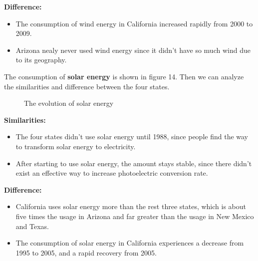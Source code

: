 \documentclass{mcmthesis}
\begin{document}
{\bf{Difference:}}

\begin{itemize}
\item The consumption of wind energy in California increased rapidly from 2000 to 2009.
\item Arizona nealy never used wind energy since it didn't have so much wind due to its geography.
\end{itemize}

The consumption of {\bf{solar energy}} is shown in figure 14. Then we can analyze the similarities and difference between the four states.

\begin{figure}[H]
  \caption{The evolution of solar energy}\label{figure14}
\end{figure}

{\bf{Similarities:}}

\begin{itemize}
\item The four states didn't use solar energy until 1988, since people find the way to transform solar energy to electricity.
\item After starting to use solar energy, the amount stays stable, since there didn't exist an effective way to increase photoelectric conversion rate.
\end{itemize}

{\bf{Difference:}}

\begin{itemize}
\item California uses solar energy more than the rest three states, which is about five times  the usage in Arizona and far greater than the usage in New Mexico and Texas.
\item The consumption of solar energy in California experiences a decrease from 1995 to 2005, and a rapid recovery from 2005.
\end{itemize}
\end{document}
